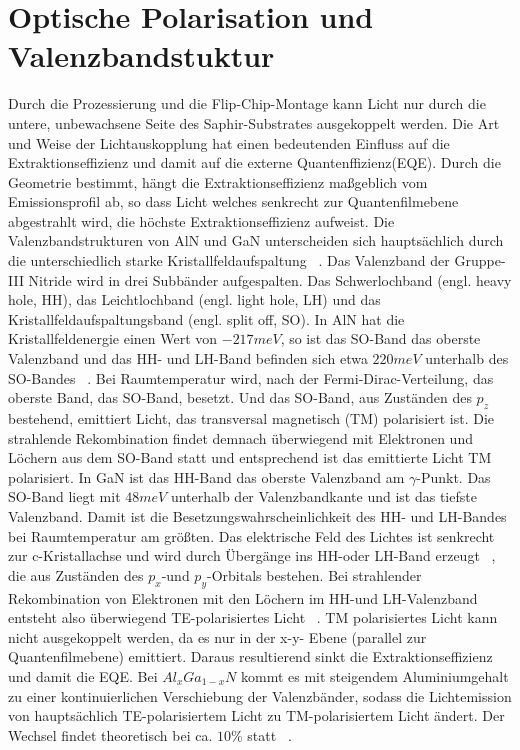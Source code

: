 \thispagestyle{fancy}

\section{Optische Polarisation und Valenzbandstuktur}

Durch die Prozessierung und die Flip-Chip-Montage kann Licht nur durch die untere, unbewachsene Seite des Saphir-Substrates ausgekoppelt werden. Die Art und Weise der Lichtauskopplung hat einen bedeutenden Einfluss auf die Extraktionseffizienz und damit auf die externe Quantenffizienz(EQE). Durch die Geometrie bestimmt, hängt die Extraktionseffizienz maßgeblich vom Emissionsprofil ab, so dass Licht welches senkrecht zur Quantenfilmebene abgestrahlt wird, die höchste Extraktionseffizienz aufweist. 
Die Valenzbandstrukturen von AlN und GaN unterscheiden sich hauptsächlich durch die unterschiedlich starke Kristallfeldaufspaltung ~\cite{doi:10.1063/1.117689}. 
Das Valenzband der Gruppe-III Nitride wird in drei Subbänder aufgespalten. 
Das Schwerlochband (engl. heavy hole, HH), das Leichtlochband (engl. light hole, LH) und das Kristallfeldaufspaltungsband (engl. split off, SO). 
In AlN hat die Kristallfeldenergie einen Wert von $-217meV$, so ist das SO-Band das oberste Valenzband und das HH- und LH-Band befinden sich etwa $220meV$ unterhalb des SO-Bandes ~\cite{doi:10.1063/1.2840176}. Bei Raumtemperatur wird, nach der Fermi-Dirac-Verteilung, das oberste Band, das SO-Band, besetzt. 
Und das SO-Band, aus Zuständen des $p_z$ bestehend, emittiert Licht, das transversal magnetisch (TM) polarisiert ist. Die strahlende Rekombination findet demnach überwiegend mit Elektronen und Löchern aus dem SO-Band statt und entsprechend ist das emittierte Licht TM polarisiert.
In GaN ist das HH-Band das oberste Valenzband am $\gamma$-Punkt. Das SO-Band liegt mit $48meV$ unterhalb der Valenzbandkante und ist das tiefste Valenzband. Damit ist die Besetzungswahrscheinlichkeit des HH- und LH-Bandes bei Raumtemperatur am größten. Das elektrische Feld des Lichtes ist senkrecht zur c-Kristallachse und wird durch Übergänge ins HH-oder LH-Band erzeugt ~\cite{doi:10.1063/1.3574025}, die aus Zuständen des $p_x$-und $p_y$-Orbitals bestehen. Bei strahlender Rekombination von Elektronen mit den Löchern im HH-und LH-Valenzband entsteht also überwiegend TE-polarisiertes Licht ~\cite{doi:10.1063/1.3574025}. 
TM polarisiertes Licht kann nicht ausgekoppelt werden, da es nur in der x-y- Ebene (parallel zur Quantenfilmebene) emittiert. Daraus resultierend sinkt die Extraktionseffizienz und damit die EQE. Bei $Al_{x}Ga_{1-x}N$ kommt es mit steigendem Aluminiumgehalt zu einer kontinuierlichen Verschiebung der Valenzbänder, sodass die Lichtemission von hauptsächlich TE-polarisiertem Licht zu TM-polarisiertem Licht ändert. Der Wechsel findet theoretisch bei ca. $10\%$ statt ~\cite{doi:10.1063/1.3675451}.
 